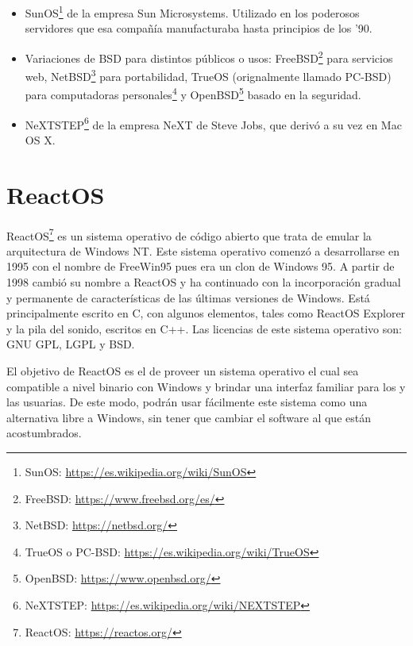 \begin{itemize}
	\item SunOS\footnote{SunOS: \url{https://es.wikipedia.org/wiki/SunOS}} de la empresa Sun Microsystems. Utilizado en los poderosos servidores que esa compañía manufacturaba hasta principios de los '90.
	\item Variaciones de BSD para distintos públicos o usos: FreeBSD\footnote{FreeBSD: \url{https://www.freebsd.org/es/}} para servicios web, NetBSD\footnote{NetBSD: \url{https://netbsd.org/}} para portabilidad, TrueOS (orignalmente llamado PC-BSD) para computadoras personales\footnote{TrueOS o PC-BSD: \url{https://es.wikipedia.org/wiki/TrueOS}} y OpenBSD\footnote{OpenBSD: \url{https://www.openbsd.org/}} basado en la seguridad.
	\item NeXTSTEP\footnote{NeXTSTEP: \url{https://es.wikipedia.org/wiki/NEXTSTEP}} de la empresa NeXT de Steve Jobs, que derivó a su vez en Mac OS X\cite{michan10}.
\end{itemize}

 
\section{ReactOS}

ReactOS\footnote{ReactOS: \url{https://reactos.org/}} es un sistema operativo de código abierto que trata de emular la arquitectura de Windows NT. Este sistema operativo comenzó a desarrollarse en 1995 con el nombre de FreeWin95 pues era un clon de Windows 95. A partir de 1998 cambió su nombre a ReactOS y ha continuado con la incorporación gradual y permanente de características de las últimas versiones de Windows. Está principalmente escrito en C, con algunos elementos, tales como ReactOS Explorer y la pila del sonido, escritos en C++. Las licencias de este sistema operativo son: GNU GPL, LGPL y BSD.

El objetivo de ReactOS es el de proveer un sistema operativo el cual sea compatible a nivel binario con Windows y brindar una interfaz familiar para los y las usuarias. De este modo, podrán usar fácilmente este sistema como una alternativa libre a Windows, sin tener que cambiar el software al que están acostumbrados.

